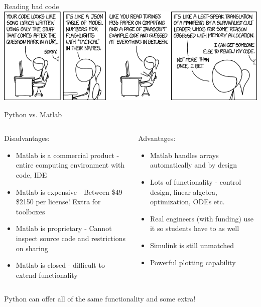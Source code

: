 \documentclass[11pt,professionalfonts]{beamer}
\begin{document}
\begin{frame}{Reading bad code}
    \centering
    \includegraphics[width=\textwidth, height=\textheight,keepaspectratio]{figures/code_quality_3.png}
\end{frame}

\begin{frame}{Python vs. Matlab}
\begin{columns}[t]
\begin{column}{0.5\textwidth}
Disadvantages:
    \begin{itemize}
        \item Matlab is a commercial product - entire computing environment with code, IDE
        \item Matlab is expensive - Between \$49 - \$2150 per license! Extra for toolboxes
        \item Matlab is proprietary - Cannot inspect source code and restrictions on sharing 
        \item Matlab is closed - difficult to extend functionality 
    \end{itemize}
\end{column}
\pause
\begin{column}{0.5\textwidth}
    Advantages:
    \begin{itemize}
        \item Matlab handles arrays automatically and by design
        \item Lots of functionality - control design, linear algebra, optimization, ODEs etc.
        \item Real engineers (with funding) use it so students have to as well
        \item Simulink is still unmatched
        \item Powerful plotting capability
    \end{itemize}
\end{column}
\end{columns}
\pause
\begin{alertblock}{}
    \centering
    Python can offer all of the same functionality and some extra!
\end{alertblock}
\end{frame}
\end{document}

